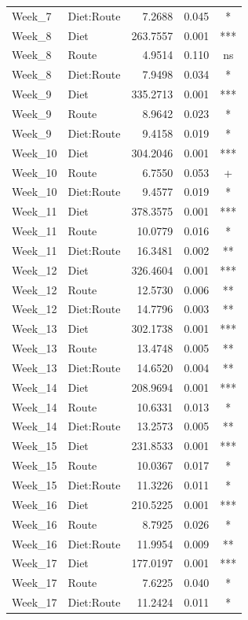 \documentclass[
  12pt,
  letterpaper,
]{article}
\begin{document}
\begin{longtable}{l|lrrc}
Week\_7 & Diet:Route & 7.2688 & 0.045 & * \\ 
Week\_8 & Diet & 263.7557 & 0.001 & *** \\ 
Week\_8 & Route & 4.9514 & 0.110 & ns \\ 
Week\_8 & Diet:Route & 7.9498 & 0.034 & * \\ 
Week\_9 & Diet & 335.2713 & 0.001 & *** \\ 
Week\_9 & Route & 8.9642 & 0.023 & * \\ 
Week\_9 & Diet:Route & 9.4158 & 0.019 & * \\ 
Week\_10 & Diet & 304.2046 & 0.001 & *** \\ 
Week\_10 & Route & 6.7550 & 0.053 & + \\ 
Week\_10 & Diet:Route & 9.4577 & 0.019 & * \\ 
Week\_11 & Diet & 378.3575 & 0.001 & *** \\ 
Week\_11 & Route & 10.0779 & 0.016 & * \\ 
Week\_11 & Diet:Route & 16.3481 & 0.002 & ** \\ 
Week\_12 & Diet & 326.4604 & 0.001 & *** \\ 
Week\_12 & Route & 12.5730 & 0.006 & ** \\ 
Week\_12 & Diet:Route & 14.7796 & 0.003 & ** \\ 
Week\_13 & Diet & 302.1738 & 0.001 & *** \\ 
Week\_13 & Route & 13.4748 & 0.005 & ** \\ 
Week\_13 & Diet:Route & 14.6520 & 0.004 & ** \\ 
Week\_14 & Diet & 208.9694 & 0.001 & *** \\ 
Week\_14 & Route & 10.6331 & 0.013 & * \\ 
Week\_14 & Diet:Route & 13.2573 & 0.005 & ** \\ 
Week\_15 & Diet & 231.8533 & 0.001 & *** \\ 
Week\_15 & Route & 10.0367 & 0.017 & * \\ 
Week\_15 & Diet:Route & 11.3226 & 0.011 & * \\ 
Week\_16 & Diet & 210.5225 & 0.001 & *** \\ 
Week\_16 & Route & 8.7925 & 0.026 & * \\ 
Week\_16 & Diet:Route & 11.9954 & 0.009 & ** \\ 
Week\_17 & Diet & 177.0197 & 0.001 & *** \\ 
Week\_17 & Route & 7.6225 & 0.040 & * \\ 
Week\_17 & Diet:Route & 11.2424 & 0.011 & * \\ 

\end{longtable}
\end{document}
